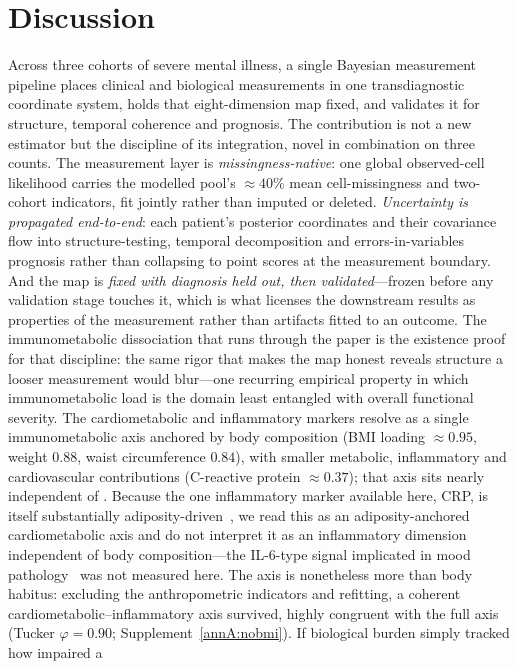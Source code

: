 \section{Discussion}

Across three cohorts of severe mental illness, a single Bayesian measurement pipeline
places clinical and biological measurements in one transdiagnostic coordinate system,
holds that eight-dimension map fixed, and validates it for structure, temporal coherence
and prognosis. The contribution is not a new estimator but the discipline of its
integration, novel in combination on three counts. The measurement layer is
\emph{missingness-native}: one global observed-cell likelihood carries the modelled pool's
$\approx 40\%$ mean cell-missingness and two-cohort indicators, fit jointly rather than
imputed or deleted. \emph{Uncertainty is propagated end-to-end}: each patient's posterior
coordinates and their covariance flow into structure-testing, temporal decomposition and
errors-in-variables prognosis rather than collapsing to point scores at the measurement
boundary. And the map is \emph{fixed with diagnosis held out, then validated}---frozen
before any validation stage touches it, which is what licenses the downstream results as
properties of the measurement rather than artifacts fitted to an outcome. The
immunometabolic dissociation that runs through the paper is the existence proof for that
discipline: the same rigor that makes the map honest reveals structure a looser
measurement would blur---one recurring empirical property in which immunometabolic load is
the domain least entangled with overall functional severity. The cardiometabolic and inflammatory markers resolve as a single
immunometabolic axis anchored by body composition (BMI loading $\approx 0.95$, weight
$0.88$, waist circumference $0.84$), with smaller metabolic, inflammatory and
cardiovascular contributions (C-reactive protein $\approx 0.37$); that axis sits nearly
independent of \Gfac{}. Because the one inflammatory marker available here, CRP, is itself
substantially adiposity-driven~\citep{kappelmann2021,norton2025crp}, we read this as an
adiposity-anchored cardiometabolic axis and do not interpret it as an inflammatory
dimension independent of body composition---the IL-6-type signal implicated in mood
pathology~\citep{ye2021inflammation,milaneschi2021} was not measured here. The axis is
nonetheless more than body habitus: excluding the anthropometric indicators and refitting,
a coherent cardiometabolic--inflammatory axis survived, highly congruent with the full axis
(Tucker $\varphi=0.90$; Supplement~\ref{annA:nobmi}). If biological burden simply tracked how impaired a
